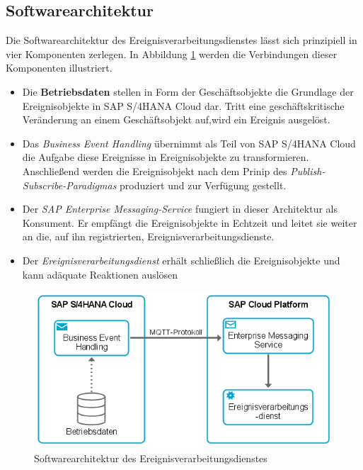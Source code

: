 \subsection{Softwarearchitektur}
Die Softwarearchitektur des Ereignisverarbeitungsdienstes lässt sich prinzipiell in vier Komponenten zerlegen. In Abbildung \ref{fig:Softwarearchitektur des Ereignisverarbeitungsdienstes} werden die Verbindungen dieser Komponenten illustriert.

\begin{itemize}
    \item Die \textbf{Betriebsdaten} stellen in Form der Geschäftsobjekte die Grundlage der Ereignisobjekte in SAP S/4HANA Cloud dar. Tritt eine geschäftskritische Veränderung an einem Geschäftsobjekt auf,wird ein Ereignis ausgelöst.
    \item Das \textit{Business Event Handling} übernimmt als Teil von SAP S/4HANA Cloud die Aufgabe diese Ereignisse in Ereignisobjekte zu transformieren. Anschließend werden die Ereignisobjekt nach dem Prinip des \textit{Publish-Subscribe-Paradigmas} produziert und zur Verfügung gestellt.
    \item Der \textit{SAP Enterprise Messaging-Service} fungiert in dieser Architektur als Konsument. Er empfängt die Ereignisobjekte in Echtzeit und leitet sie weiter an die, auf ihn registrierten, Ereignisverarbeitungsdienste.
    \item Der \textit{Ereignisverarbeitungsdienst} erhält schließlich die Ereignisobjekte und kann adäquate Reaktionen auslösen
\end{itemize}

\begin{figure}[H]
	\centering 
    \includegraphics[width=.9\textwidth]{img/eventarch.png}	
    \caption[Softwarearchitektur des Ereignisverarbeitungsdienstes]
    {Softwarearchitektur des Ereignisverarbeitungsdienstes\protect\footnotemark}
    \label{fig:Softwarearchitektur des Ereignisverarbeitungsdienstes}
\end{figure}



